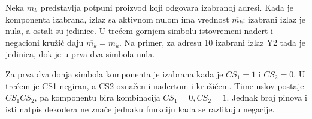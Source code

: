 
Neka \(m_k\) predstavlja potpuni proizvod koji odgovara izabranoj adresi. Kada je komponenta izabrana, izlaz sa aktivnom nulom ima vrednost \(\overline{m_k}\): izabrani izlaz je nula, a ostali su jedinice. U trećem gornjem simbolu istovremeni nadcrt i negacioni kružić daju \(\overline{\overline{m_k}}=m_k\). Na primer, za adresu 10 izabrani izlaz Y2 tada je jedinica, dok je u prva dva simbola nula.

Za prva dva donja simbola komponenta je izabrana kada je \(CS_1=1\) i \(CS_2=0\). U trećem je CS1 negiran, a CS2 označen i nadcrtom i kružićem. Time uslov postaje \(\overline{CS_1}CS_2\), pa komponentu bira kombinacija \(CS_1=0,CS_2=1\). Jednak broj pinova i isti natpis dekodera ne znače jednaku funkciju kada se razlikuju negacije.
